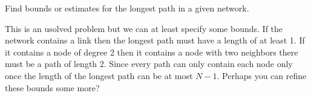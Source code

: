 

Find bounds or estimates for the longest path in a given network. 

\solution
This is an usolved problem but we can at least specify some bounds. If the network contains a link then the longest path must have a length of at least 1. 
If it contains a node of degree 2 then it contains a node with two neighbors there must be a path of length 2. Since every path can only contain each node only once the length of the longest path can be at most $N-1$. Perhaps you can refine these bounds some more? 

\solutionend